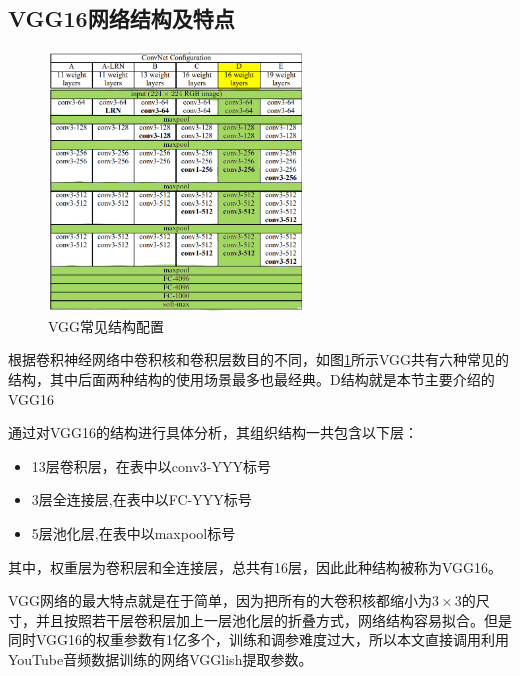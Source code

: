 \subsection{VGG16网络结构及特点}
     \begin{figure}[h]
      \centering
      \includegraphics[width=0.6\textwidth]{figures/VGG2.png}
      \caption{VGG常见结构配置}
      \label{fig:vgg2}
    \end{figure}
根据卷积神经网络中卷积核和卷积层数目的不同，如图\ref{fig:vgg2}所示VGG共有六种常见的结构，其中后面两种结构的使用场景最多也最经典。D结构就是本节主要介绍的VGG16


通过对VGG16的结构进行具体分析，其组织结构一共包含以下层：

\begin{itemize}
    \item13层卷积层，在表中以conv3-YYY标号
    \item3层全连接层,在表中以FC-YYY标号
    \item5层池化层,在表中以maxpool标号
\end{itemize}

其中，权重层为卷积层和全连接层，总共有16层，因此此种结构被称为VGG16。

VGG网络的最大特点就是在于简单，因为把所有的大卷积核都缩小为\(3\times3\)的尺寸，并且按照若干层卷积层加上一层池化层的折叠方式，网络结构容易拟合。但是同时VGG16的权重参数有1亿多个，训练和调参难度过大，所以本文直接调用利用YouTube音频数据训练的网络VGGlish提取参数。

